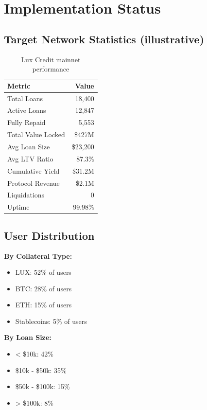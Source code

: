 \section{Implementation Status}


\subsection{Target Network Statistics (illustrative)}

\begin{table}[h]
\centering
\begin{tabular}{@{}lr@{}}
\toprule
\textbf{Metric} & \textbf{Value} \\ \midrule
Total Loans & 18,400 \\
Active Loans & 12,847 \\
Fully Repaid & 5,553 \\
Total Value Locked & \$427M \\
Avg Loan Size & \$23,200 \\
Avg LTV Ratio & 87.3\% \\
Cumulative Yield & \$31.2M \\
Protocol Revenue & \$2.1M \\
Liquidations & 0 \\
Uptime & 99.98\% \\ \bottomrule
\end{tabular}
\caption{Lux Credit mainnet performance}
\end{table}

\subsection{User Distribution}

\textbf{By Collateral Type:}
\begin{itemize}
\item LUX: 52\% of users
\item BTC: 28\% of users
\item ETH: 15\% of users
\item Stablecoins: 5\% of users
\end{itemize}

\textbf{By Loan Size:}
\begin{itemize}
\item < \$10k: 42\%
\item \$10k - \$50k: 35\%
\item \$50k - \$100k: 15\%
\item > \$100k: 8\%
\end{itemize}

